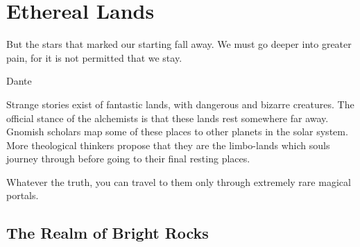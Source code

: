 \chapter{Ethereal Lands}
\label{ether}

\epigraph{But the stars that marked our starting fall away.
We must go deeper into greater pain,
for it is not permitted that we stay.}{Dante}

\begin{multicols}{2}

\noindent
Strange stories exist of fantastic lands, with dangerous and bizarre creatures.  The official stance of the \gls{alchemists} is that these lands rest somewhere far away.
Gnomish scholars map some of these places to other planets in the solar system.
More theological thinkers propose that they are the limbo-lands which souls journey through before going to their final resting places.

Whatever the truth, you can travel to them only through extremely rare magical portals.

\end{multicols}

\section{The Realm of Bright Rocks}
\label{brightrocks}

